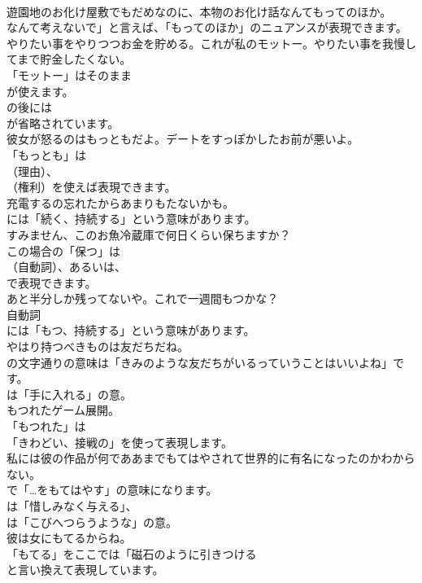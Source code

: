 \documentclass[8pt]{extreport}
\begin{document}
\begin{CJK}{UTF8}{min}
\\	遊園地のお化け屋敷でもだめなのに、本物のお化け話なんてもってのほか。 
\\	なんて考えないで」と言えば、「もってのほか」のニュアンスが表現できます。	
\\	やりたい事をやりつつお金を貯める。これが私のモットー。やりたい事を我慢してまで貯金したくない。 
\\	「モットー」はそのまま
\\	が使えます。
\\	の後には
\\	が省略されています。	
\\	彼女が怒るのはもっともだよ。デートをすっぽかしたお前が悪いよ。 
\\	「もっとも」は
\\	（理由）、
\\	（権利）を使えば表現できます。	
\\	充電するの忘れたからあまりもたないかも。 
\\	には「続く、持続する」という意味があります。	
\\	すみません、このお魚冷蔵庫で何日くらい保ちますか？ 
\\	この場合の「保つ」は
\\	（自動詞）、あるいは、
\\	で表現できます。	
\\	あと半分しか残ってないや。これで一週間もつかな？ 
\\	自動詞 
\\	には「もつ、持続する」という意味があります。	
\\	やはり持つべきものは友だちだね。 
\\	の文字通りの意味は「きみのような友だちがいるっていうことはいいよね」です。
\\	は「手に入れる」の意。	
\\	もつれたゲーム展開。 
\\	「もつれた」は
\\	「きわどい、接戦の」を使って表現します。	
\\	私には彼の作品が何でああまでもてはやされて世界的に有名になったのかわからない。 
\\	で「…をもてはやす」の意味になります。
\\	は「惜しみなく与える」、
\\	は「こびへつらうような」の意。	
\\	彼は女にもてるからね。 
\\	「もてる」をここでは「磁石のように引きつける
\\	と言い換えて表現しています。	

\end{CJK}
\end{document}

